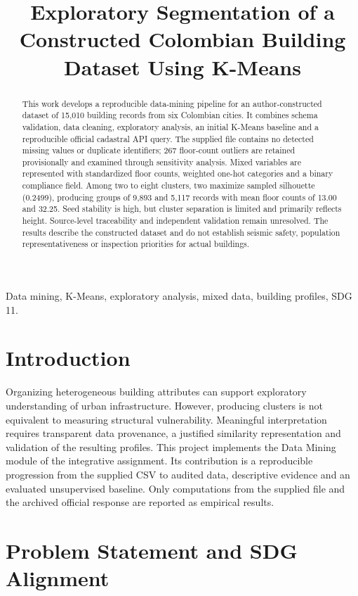 \documentclass[conference]{IEEEtran}
\title{Exploratory Segmentation of a Constructed Colombian Building Dataset Using K-Means}
\author{\IEEEauthorblockN{Henry David Muñoz Molina}\IEEEauthorblockA{Data Engineering and Artificial Intelligence\\Universidad Santo Tomás, Tunja, Colombia\\Data Mining -- Integrative Project Progress Report}}
\begin{document}
\maketitle
\begin{abstract}
This work develops a reproducible data-mining pipeline for an author-constructed dataset of 15,010 building records from six Colombian cities. It combines schema validation, data cleaning, exploratory analysis, an initial K-Means baseline and a reproducible official cadastral API query. The supplied file contains no detected missing values or duplicate identifiers; 267 floor-count outliers are retained provisionally and examined through sensitivity analysis. Mixed variables are represented with standardized floor counts, weighted one-hot categories and a binary compliance field. Among two to eight clusters, two maximize sampled silhouette (0.2499), producing groups of 9,893 and 5,117 records with mean floor counts of 13.00 and 32.25. Seed stability is high, but cluster separation is limited and primarily reflects height. Source-level traceability and independent validation remain unresolved. The results describe the constructed dataset and do not establish seismic safety, population representativeness or inspection priorities for actual buildings.
\end{abstract}
\begin{IEEEkeywords}
Data mining, K-Means, exploratory analysis, mixed data, building profiles, SDG 11.
\end{IEEEkeywords}
\section{Introduction}
Organizing heterogeneous building attributes can support exploratory understanding of urban infrastructure. However, producing clusters is not equivalent to measuring structural vulnerability. Meaningful interpretation requires transparent data provenance, a justified similarity representation and validation of the resulting profiles.
This project implements the Data Mining module of the integrative assignment. Its contribution is a reproducible progression from the supplied CSV to audited data, descriptive evidence and an evaluated unsupervised baseline. Only computations from the supplied file and the archived official response are reported as empirical results.

\section{Problem Statement and SDG Alignment}
\end{document}
